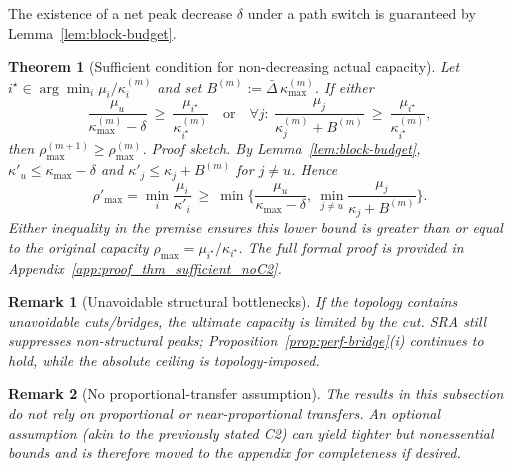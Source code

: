 \documentclass[journal]{IEEEtran}
\newtheorem{theorem}{Theorem}
\newtheorem{remark}{Remark}
\begin{document}
The existence of a net peak decrease 
$\delta$ under a path switch is guaranteed by Lemma~\ref{lem:block-budget}.
\begin{theorem}[Sufficient condition for non-decreasing actual capacity]
\label{thm:sufficient-noC2}
Let $i^\star\in\arg\min_i \mu_i/\kappa^{(m)}_i$ and set $B^{(m)}:=\bar\Delta\,\kappa^{(m)}_{\max}$.
If either
\begin{equation}
\frac{\mu_u}{\kappa^{(m)}_{\max}-\delta}\ \ge\ \frac{\mu_{i^\star}}{\kappa^{(m)}_{i^\star}}
\quad\text{or}\quad
\forall j:\ \frac{\mu_j}{\kappa^{(m)}_{j}+B^{(m)}}\ \ge\ \frac{\mu_{i^\star}}{\kappa^{(m)}_{i^\star}},
\end{equation}
then $\rho_{\max}^{(m+1)}\ge \rho_{\max}^{(m)}$.
\emph{Proof sketch.}
By Lemma~\ref{lem:block-budget}, $\kappa'_{u}\le \kappa_{\max}-\delta$ and
$\kappa'_j\le \kappa_j+B^{(m)}$ for $j\neq u$.
Hence
\begin{equation}
\rho'_{\max}=\min_i\frac{\mu_i}{\kappa'_i}
\ \ge\ \min\!\Big\{\frac{\mu_u}{\kappa_{\max}-\delta},\ \min_{j\neq u}\frac{\mu_j}{\kappa_j+B^{(m)}}\Big\}.
\end{equation}
Either inequality in the premise ensures this lower bound is greater than or equal to the original capacity $\rho_{\max}=\mu_{i^\star}/\kappa_{i^\star}$.
\textit{The full formal proof is provided in Appendix~\ref{app:proof_thm_sufficient_noC2}.}
\end{theorem}

\begin{remark}[Unavoidable structural bottlenecks]
If the topology contains unavoidable cuts/bridges, the ultimate capacity is limited by the cut.
SRA still suppresses \emph{non-structural} peaks; Proposition~\ref{prop:perf-bridge}(i)
continues to hold, while the absolute ceiling is topology-imposed.
\end{remark}

\begin{remark}[No proportional-transfer assumption]
The results in this subsection do not rely on proportional or near-proportional transfers.
An optional assumption (akin to the previously stated C2) can yield tighter but nonessential bounds
and is therefore moved to the appendix for completeness if desired.
\end{remark}

\end{document}
